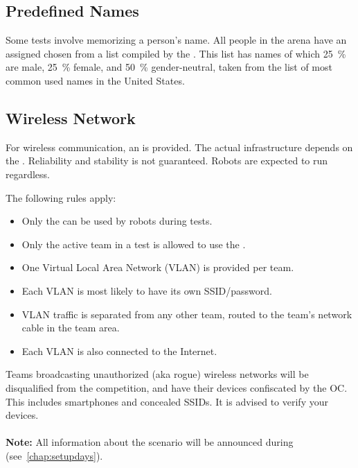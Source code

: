 \subsection{Predefined Names}
\label{sec:rules:scenario:names}
Some tests involve memorizing a person's name. All people in the arena have an assigned \PredefinedName{} chosen from a list compiled by the \TC{}. This list has \NumNames{} names of which \SI{25}{\percent} are male, \SI{25}{\percent} female, and \SI{50}{\percent} gender-neutral, taken from the list of most common used names in the United States.


\subsection{Wireless Network}
\label{sec:rules:scenario:wifi}

For wireless communication, an \ArenaNetwork{} is provided. The actual infrastructure depends on the \LOC{}. Reliability and stability is not guaranteed. Robots are expected to run regardless.

The following rules apply:

\begin{itemize}
	\item Only the \ArenaNetwork{} can be used by robots during tests.
	\item Only the active team in a test is allowed to use the \ArenaNetwork{}.
	\item One Virtual Local Area Network (VLAN) is provided per team.
	\item Each VLAN is most likely to have its own SSID/password.
	\item VLAN traffic is separated from any other team, routed to the team's network cable in the team area.
	\item Each VLAN is also connected to the Internet.
\end{itemize}

\noindent Teams broadcasting unauthorized (aka rogue) wireless networks will be disqualified from the competition, and have their devices confiscated by the OC. This includes smartphones and concealed SSIDs. It is advised to verify your devices.
\\ \\
\textbf{Note:} All information about the scenario will be announced during \SetupDays{} (see~\ref{chap:setupdays}).

